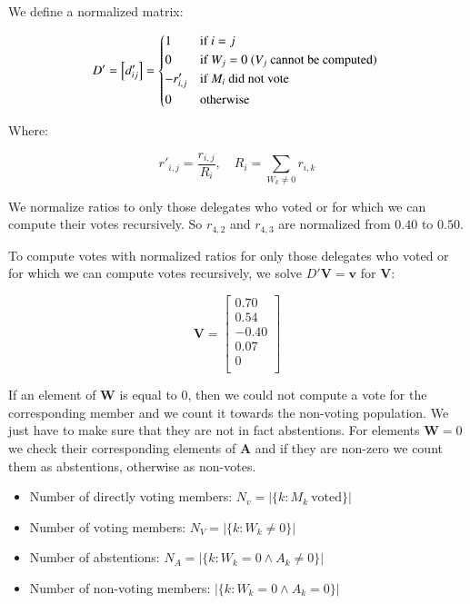 \documentclass{sigchi}
\begin{document}
We define a normalized matrix:

\begin{displaymath}
D' = \left[d'_{ij}\right] = \begin{dcases*}
 1 & if $i = j$ \\
 0 & if $W_j = 0$ ($V_j$ cannot be computed) \\
 -r'_{i,j} & if $M_i$ did not vote \\
 0 & otherwise \\
\end{dcases*}
\end{displaymath}

Where:

\begin{displaymath}
r'_{i,j} = \frac{r_{i,j}}{R_i},\quad R_i = \sum_{W_k \ne 0} r_{i,k}
\end{displaymath}

We normalize ratios to only those delegates who voted or for which we can
compute their votes recursively.
So $r_{4,2}$ and $r_{4,3}$ are normalized from $0.40$ to $0.50$.

To compute votes with normalized ratios for only those delegates who voted or for which we can compute votes recursively,
we solve $D' \boldsymbol{V} = \boldsymbol{v}$ for $\boldsymbol{V}$:

\begin{displaymath}
\mathbf{V} = \left[ \begin{array}{c}
0.70 \\
0.54 \\
-0.40 \\
0.07 \\
0 \\
\end{array} \right]
\end{displaymath}

If an element of $\boldsymbol{W}$ is equal to $0$, then we could not compute a vote for the corresponding
member and we count it towards the non-voting population.
We just have to make sure that they are not in fact abstentions.
For elements $\boldsymbol{W} = 0$ we check their corresponding elements of $\boldsymbol{A}$ and if they are
non-zero we count them as abstentions, otherwise as non-votes.

\begin{itemize}
\item Number of directly voting members: $N_v = \left| \{ k: M_k~\mathrm{voted} \} \right|$
\item Number of voting members: $N_V = \left| \{ k: W_k \ne 0 \} \right|$
\item Number of abstentions: $N_A = \left| \{ k:  W_k = 0 \land A_k \ne 0 \} \right|$
\item Number of non-voting members: $\left| \{ k: W_k = 0 \land A_k = 0 \} \right|$
\end{itemize}
\end{document}
